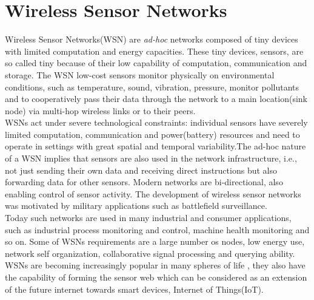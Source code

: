 \chapter{Wireless Sensor Networks}
Wireless Sensor Networks(WSN) are \textit{ad-hoc} networks composed of tiny devices with limited computation and energy capacities. These tiny devices, sensors, are so called tiny because of their low capability of computation, communication and storage. The WSN  low-cost sensors monitor physically on environmental conditions, such as temperature, sound, vibration, pressure, monitor pollutants and to cooperatively pass their data through the network to a main location(sink node) via multi-hop wireless links\cite{asad2013survey} or to their peers.\\ 
WSNs act under severe technological constraints: individual sensors have severely limited computation, communication and power(battery) resources and need to operate in settings with great spatial and temporal variability.The ad-hoc nature of a WSN implies that sensors are also used in the network infrastructure, i.e., not just sending their own data and receiving direct instructions but also forwarding data for other sensors. Modern networks are bi-directional, also enabling control of sensor activity. The development of wireless sensor networks was motivated by military applications such as battlefield surveillance.\\
Today such networks are used in many industrial and consumer applications, such as industrial process monitoring and control, machine health monitoring and so on. Some of WSNs requirements are a large number os nodes, low energy use, network self organization, collaborative signal processing and querying ability.\\
 WSNs are becoming increasingly popular in many spheres of life \cite{castelluccia2005efficient}, they also have the capability of forming the sensor web which can be considered as an extension of the future internet towards smart devices, Internet of Things(IoT)\cite{asad2013survey}.  \\
